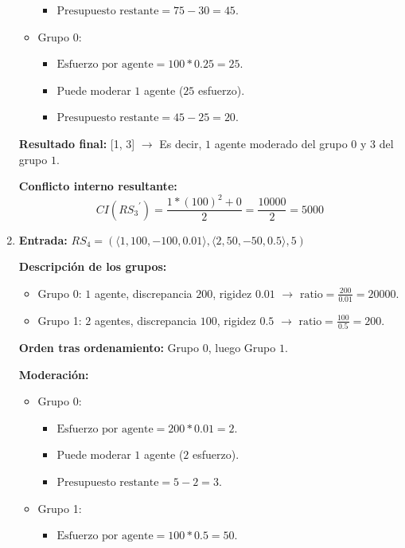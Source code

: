 \begin{enumerate}
\begin{itemize}
\begin{itemize}
					\item $\text{Presupuesto restante} = 75 - 30 = 45$.
				\end{itemize}
			\item Grupo 0:
				\begin{itemize}
					\item $\text{Esfuerzo por agente} = 100 * 0.25 = 25$.

					\item Puede moderar $1$ agente ($25$ esfuerzo).

					\item $\text{Presupuesto restante} = 45 - 25 = 20$.
				\end{itemize}
		\end{itemize}

		\textbf{Resultado final:} [1, 3] $\rightarrow$ Es decir, $1$ agente moderado del grupo $0$ y $3$ del grupo $1$.

		\textbf{Conflicto interno resultante:}
		\begin{equation}
			CI\left( { RS_3 }^\prime \right) = \frac{ 1 * (100)^2 + 0 }{ 2 } = \frac{ 10000 }{ 2 } = 5000
		\end{equation}

		\item \textbf{Entrada:} $RS_4 = (\langle 1,100,-100,0.01 \rangle,\langle 2,50,-50,0.5 \rangle, 5)$

		\textbf{Descripción de los grupos:}
			\begin{itemize}
				\item Grupo 0: $1$ agente, discrepancia $200$, rigidez $0.01$ $\rightarrow$ $\text{ratio} = \frac{ 200 }{ 0.01 } = 20000$.
				\item Grupo 1: $2$ agentes, discrepancia $100$, rigidez $0.5$ $\rightarrow$ $\text{ratio} = \frac{ 100 }{ 0.5 } = 200$.
			\end{itemize}

		\textbf{Orden tras ordenamiento:} Grupo $0$, luego Grupo $1$.

		\textbf{Moderación:}
		\begin{itemize}
			\item Grupo 0:
				\begin{itemize}
					\item $\text{Esfuerzo por agente} = 200 * 0.01 = 2$.

					\item Puede moderar $1$ agente ($2$ esfuerzo).

					\item $\text{Presupuesto restante} = 5 - 2 = 3$.
				\end{itemize}
			\item Grupo 1:
				\begin{itemize}
					\item $\text{Esfuerzo por agente} = 100 * 0.5 = 50$.


\end{itemize}
\end{itemize}
\end{enumerate}
